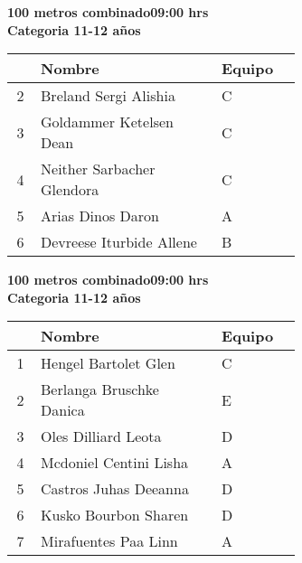 \begin{minipage}{0.95\linewidth}\vspace{0.5cm} 
\begin{flushleft}
\textbf{
\hspace{-0.15cm}100 metros combinado\hspace{1.5cm}09:00 hrs \\Categoria 11-12 años}\vspace{-0.2cm} 
\end{flushleft}
\begin{tabular}{cp{0.63\linewidth}l}
\hline
& \textbf{Nombre} & \textbf{Equipo} \\ \hline
2 & Breland Sergi Alishia & C \\ 
3 & Goldammer Ketelsen Dean & C \\ 
4 & Neither Sarbacher Glendora & C \\ 
5 & Arias Dinos Daron & A \\ 
6 & Devreese Iturbide Allene & B \\ 
\end{tabular}
\end{minipage}
\begin{minipage}{0.95\linewidth}\vspace{0.5cm} 
\begin{flushleft}
\textbf{
\hspace{-0.15cm}100 metros combinado\hspace{1.5cm}09:00 hrs \\Categoria 11-12 años}\vspace{-0.2cm} 
\end{flushleft}
\begin{tabular}{cp{0.63\linewidth}l}
\hline
& \textbf{Nombre} & \textbf{Equipo} \\ \hline
1 & Hengel Bartolet Glen & C \\ 
2 & Berlanga Bruschke Danica & E \\ 
3 & Oles Dilliard Leota & D \\ 
4 & Mcdoniel Centini Lisha & A \\ 
5 & Castros Juhas Deeanna & D \\ 
6 & Kusko Bourbon Sharen & D \\ 
7 & Mirafuentes Paa Linn & A \\ 
\end{tabular}
\end{minipage}
